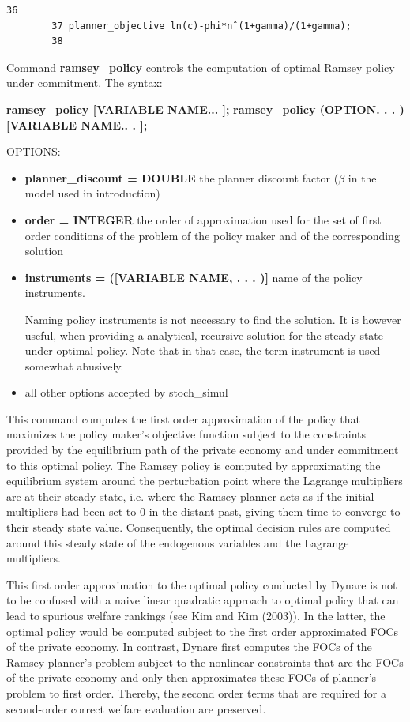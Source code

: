 \documentclass[cn,10pt,math=newtx,citestyle=gb7714-2015,bibstyle=gb7714-2015]{elegantbook}
\begin{document}
	\begin{lstlisting}[frame=shadowbox]
		36
		37 planner_objective ln(c)-phi*nˆ(1+gamma)/(1+gamma);
		38
	\end{lstlisting}
	
	Command \textbf{ramsey\_policy} controls the computation of optimal Ramsey policy under commitment. The syntax:
	
	\textbf{ramsey\_policy [VARIABLE NAME... ];}
	\textbf{ramsey\_policy (OPTION. . . ) [VARIABLE NAME.. . ];}
	
	OPTIONS:
	\begin{itemize}
		\item \textbf{planner\_discount = DOUBLE} the planner discount factor ($\beta$ in the model used in introduction)
		\item \textbf{order = INTEGER} the order of approximation used for the set of first order conditions of the problem of the policy maker and of the corresponding solution
		\item \textbf{instruments = ([VARIABLE NAME, . . . )]} name of the policy instruments.
		
		Naming policy instruments is not necessary to find the solution. It is however useful, when providing a analytical, recursive solution for the steady state under optimal policy. Note that in that case, the term instrument is used somewhat abusively.
		\item all other options accepted by stoch\_simul
	\end{itemize}
	
	This command computes the first order approximation of the policy that maximizes the policy maker’s objective function subject to the constraints provided by the equilibrium path of the private economy and under commitment to this optimal policy. The Ramsey policy is computed by approximating the equilibrium system around the perturbation point where the Lagrange multipliers are at their steady state, i.e. where the Ramsey planner acts as if the initial multipliers had been set to 0 in the distant past, giving them time to converge to their steady state value. Consequently, the optimal decision rules are computed around this steady state of the endogenous variables and the Lagrange multipliers.
	
	This first order approximation to the optimal policy conducted by Dynare is not to be confused with a naive linear quadratic approach to optimal policy that can lead to spurious welfare rankings (see Kim and Kim (2003)). In the latter, the optimal policy would be computed subject to the first order approximated FOCs of the private economy. In contrast, Dynare first computes the FOCs of the Ramsey planner’s problem subject to the nonlinear constraints that are the FOCs of the private economy and only then approximates these FOCs of planner’s problem to first order. Thereby, the second order terms that are required for a second-order correct welfare evaluation are preserved.
	
\end{document}
